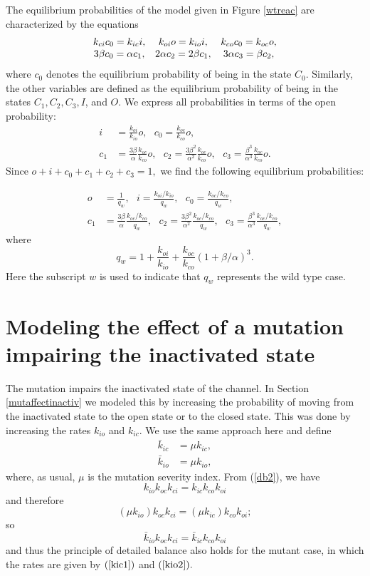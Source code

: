 The equilibrium probabilities of the model given in Figure \ref{wtreac} are
characterized by the equations
\[
\begin{array}
[c]{ccc}
k_{ci}c_{0}=k_{ic}i, & k_{oi}o=k_{io}i, & k_{co}c_{0}=k_{oc}o,\\
3\beta c_{0}=\alpha c_{1}, & 2\alpha c_{2}=2\beta c_{1}, & 3\alpha c_{3}=\beta
c_{2},
\end{array}
\]
where $c_{0}$ denotes the equilibrium probability of being in the state
$C_{0}$. Similarly, the other variables are defined as the equilibrium
probability of being in the states $C_{1},C_{2},C_{3},I$, and $O$. We express all
probabilities in terms of the open probability:
\begin{align*}
i  &  =\frac{k_{oi}}{k_{io}}o,\text{ }c_{0}=\frac{k_{oc}}{k_{co}}o,\text{ }\\
c_{1}  &  =\frac{3\beta}{\alpha}\frac{k_{oc}}{k_{co}}o,\text{ }c_{2}
=\frac{3\beta^{2}}{\alpha^{2}}\frac{k_{oc}}{k_{co}}o,\text{ }c_{3}=\frac
{\beta^{3}}{\alpha^{3}}\frac{k_{oc}}{k_{co}}o.
\end{align*}
Since $o+i+c_{0}+c_{1}+c_{2}+c_{3}=1,$ we find the following equilibrium probabilities:

\begin{align}
o  &  =\frac{1}{q_{w}},\text{ }i=\frac{k_{oi}/k_{io}}{q_{w}},\text{ }
c_{0}=\frac{k_{oc}/k_{co}}{q_{w}}, \label{prob_wt}\\
c_{1}  &  =\frac{3\beta}{\alpha}\frac{k_{oc}/k_{co}}{q_{w}},\text{ }
c_{2}=\frac{3\beta^{2}}{\alpha^{2}}\frac{k_{oc}/k_{co}}{q_{w}},\text{ }
c_{3}=\frac{\beta^{3}}{\alpha^{3}}\frac{k_{oc}/k_{co}}{q_{w}},\nonumber
\end{align}
where
\[
q_{w}=1+\frac{k_{oi}}{k_{io}}+\frac{k_{oc}}{k_{co}}\left(  1+\beta
/\alpha\right)  ^{3}.
\]
Here the subscript $w$ is used to indicate that $q_{w}$ represents the 
wild type case.

\section{Modeling the effect of a mutation impairing the inactivated state}

The mutation impairs the inactivated state of the channel. In Section
\ref{mutaffectinactiv} we modeled this by increasing the probability of moving
from the inactivated state to the open state or to the closed state. This was
done by increasing the rates $k_{io}$ and $k_{ic}.$ We use the same approach
here and define
\begin{align}
\bar{k}_{ic}  &  =\mu k_{ic},\label{kic1}\\
\bar{k}_{io}  &  =\mu k_{io}, \label{kio2}
\end{align}
where, as usual, $\mu$ is the mutation severity index. From (\ref{db2}), we
have
\[
k_{io}k_{oc}k_{ci}=k_{ic}k_{co}k_{oi}
\]
and therefore
\[
\left(  \mu k_{io}\right)  k_{oc}k_{ci}=\left(  \mu k_{ic}\right)
k_{co}k_{oi};
\]
so
\[
\bar{k}_{io}k_{oc}k_{ci}=\bar{k}_{ic}k_{co}k_{oi}
\]
and thus the principle of detailed balance also holds for the mutant case,
in which the rates are given by $(\ref{kic1})$ and $(\ref{kio2}).$

